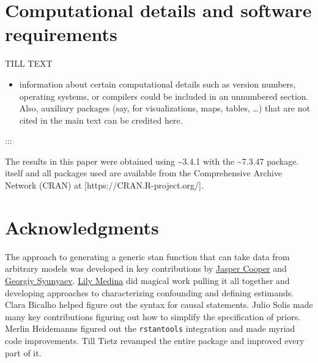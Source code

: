 \documentclass[
  article]{jss}
\providecommand{\tightlist}{%
  \setlength{\itemsep}{0pt}\setlength{\parskip}{0pt}}\usepackage{longtable,booktabs,array}
\begin{document}
\hypertarget{computational-details-and-software-requirements}{%
\section*{Computational details and software
requirements}\label{computational-details-and-software-requirements}}

TILL TEXT

\begin{itemize}
\tightlist
\item
  information about certain computational details such as version
  numbers, operating systems, or compilers could be included in an
  unnumbered section. Also, auxiliary packages (say, for visualizations,
  maps, tables, \ldots) that are not cited in the main text can be
  credited here.
\end{itemize}

:::

The results in this paper were obtained using
\textasciitilde3.4.1 with the
\textasciitilde7.3.47 package.  itself and all
packages used are available from the Comprehensive  Archive
Network (CRAN) at {[}https://CRAN.R-project.org/{]}.

\hypertarget{acknowledgments}{%
\section*{Acknowledgments}\label{acknowledgments}}

\begin{tcolorbox}[enhanced jigsaw, arc=.35mm, left=2mm, breakable, opacityback=0, bottomrule=.15mm, leftrule=.75mm, toprule=.15mm, rightrule=.15mm, colback=white]

The approach to generating a generic stan function that can take data
from arbitrary models was developed in key contributions by
\href{http://jasper-cooper.com/}{Jasper Cooper} and
\href{http://gsyunyaev.com/}{Georgiy Syunyaev}.
\href{https://lilymedina.github.io/}{Lily Medina} did magical work
pulling it all together and developing approaches to characterizing
confounding and defining estimands. Clara Bicalho helped figure out the
syntax for causal statements. Julio Solis made many key contributions
figuring out how to simplify the specification of priors. Merlin
Heidemanns figured out the \texttt{rstantools} integration and made
myriad code improvements. Till Tietz revamped the entire package and
improved every part of it.

\end{tcolorbox}
\end{document}
